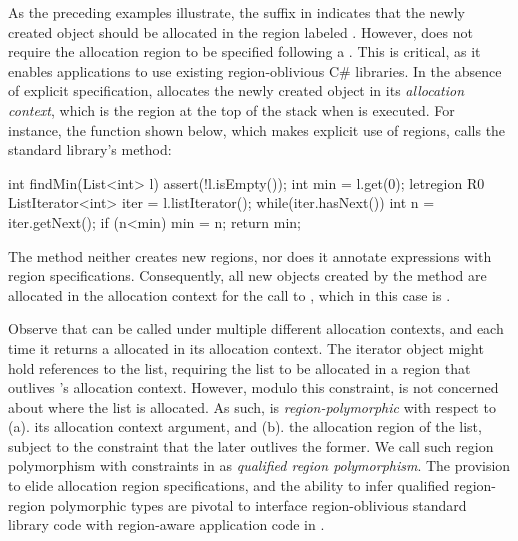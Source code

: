 As the preceding examples illustrate, the suffix  in
 indicates that the newly created object should be allocated in the region labeled .
However, \name does not require the allocation region to be specified following a .
This is critical, as it enables \name applications to use existing region-oblivious C\# libraries.
In the
absence of explicit specification, \name allocates the newly created
object in its \emph{allocation context}, which is the region at the
top of the stack when  is executed. For instance, the
 function shown below, which makes explicit use of regions,
calls the standard  library's  method:
\begin{center}
\begin{codejava}
  int findMin(List<int> l) {
    assert(!l.isEmpty());
    int min = l.get(0);
    letregion R0 {
      ListIterator<int> iter = l.listIterator();
      while(iter.hasNext()) {
        int n = iter.getNext();
        if (n<min) min = n;
      }
    }
    return min;
  }
\end{codejava}
\end{center}
The  method neither creates new regions, nor does it
annotate  expressions with region specifications. Consequently,
all new objects created by the method are allocated in the allocation
context for the call to , which in this case is
. 

Observe that  can be called under multiple different
allocation contexts, and each time it returns a 
allocated in its allocation context. The iterator object might hold
references to the list, requiring the list to be allocated in a region
that outlives \!'s allocation context. However, modulo
this constraint,  is not concerned about where the
list is allocated. As such,  is
\emph{region-polymorphic} with respect to (a). its allocation context
argument, and (b). the allocation region of the list, subject to the
constraint that the later outlives the former. We call such region
polymorphism with constraints in \name as \emph{qualified region
polymorphism}. The provision to elide allocation region
specifications, and the ability to infer qualified region-region
polymorphic types are pivotal to interface region-oblivious standard
library code with region-aware application code in \name. 

